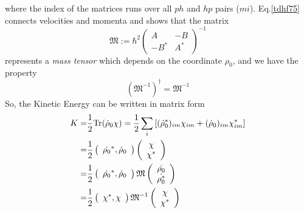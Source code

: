   where the index of the matrices runs over all $ph$ and $hp$ pairs ($mi$). Eq.\eqref{tdhf75} connects velocities and momenta and shows that the matrix
  \begin{equation}
    \mathfrak{M} := \hbar^2 \label{tdhf76}
    \left(
      \begin{array}{cc}
        A    &   -B\\
        -B^* &   A^*
      \end{array}
    \right)^{-1}
  \end{equation}
  represents a \textit{mass tensor} which depends on the coordinate $\rho_0$, and we have the property
  \begin{equation}
    (\mathfrak{M}^{-1})^{\dagger} = \mathfrak{M}^{-1} \label{tdhf77}
  \end{equation}
  So, the Kinetic Energy can be written in matrix form
  \begin{equation}
    \begin{aligned}
      K =& \frac{1}{2}{\rm Tr}(\dot{\rho}_0\chi) = \frac{1}{2}\sum_{i}\left[ (\dot{\rho}_0^*)_{im}\chi_{im} + (\dot{\rho}_0)_{im}\chi^*_{im} \right]\\ \label{tdhf78}
      =& \frac{1}{2} 
      \left(
        \begin{array}{r}
          \dot{\rho_0}^*, \dot{\rho}_0        
        \end{array}
      \right)
      \left(
        \begin{array}{c}
          \chi\\
          \chi^*
        \end{array}
      \right)\\
      =& \frac{1}{2}
      \left(
        \begin{array}{r}
          \dot{\rho_0}^*, \dot{\rho}_0        
        \end{array}
      \right)
      \mathfrak{M}
      \left(
        \begin{array}{c}
          \dot{\rho_0}\\
          \dot{\rho_0^*}
        \end{array}
      \right) \\
      =& \frac{1}{2}
      \left(
        \begin{array}{r}
          \chi^*, \chi       
        \end{array}
      \right)
      \mathfrak{M}^{-1}
      \left(
        \begin{array}{c}
          \chi\\
          \chi^*
        \end{array}
      \right) 
    \end{aligned}
  \end{equation}

